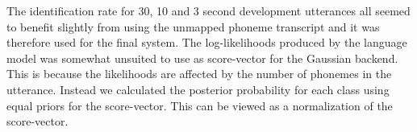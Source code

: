 The identification rate for 30, 10 and 3 second development utterances all seemed to benefit slightly from using the unmapped phoneme transcript and it was therefore used for the final system. The log-likelihoods produced by the language model was somewhat unsuited to use as score-vector for the Gaussian backend. This is because the likelihoods are affected by the number of  phonemes in the utterance. Instead we calculated the posterior probability for each class using equal priors for the score-vector. This can be viewed as a normalization of the score-vector.